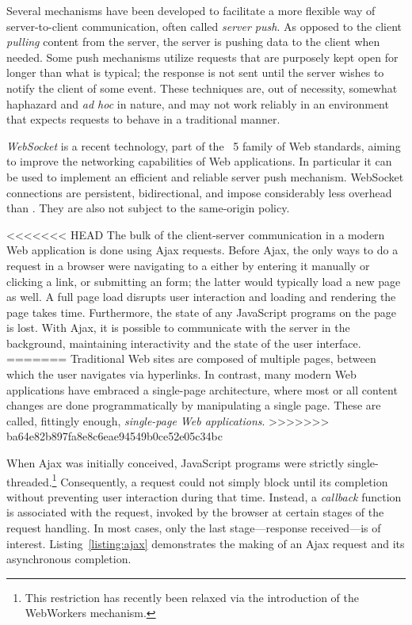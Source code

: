 Several mechanisms have been developed to facilitate a more flexible way of server-to-client communication, often called \emph{server push}. As opposed to the client \emph{pulling} content from the server, the server is pushing data to the client when needed. Some push mechanisms utilize  requests that are purposely kept open for longer than what is typical; the response is not sent until the server wishes to notify the client of some event. These techniques are, out of necessity, somewhat haphazard and \emph{ad hoc} in nature, and may not work reliably in an environment that expects  requests to behave in a traditional manner.

\emph{WebSocket} is a recent technology, part of the ~5 family of Web standards, aiming to improve the networking capabilities of Web applications. In particular it can be used to implement an efficient and reliable server push mechanism. WebSocket connections are persistent, bidirectional, and impose considerably less overhead than . They are also not subject to the same-origin policy.

<<<<<<< HEAD
The bulk of the client-server communication in a modern Web application is done using Ajax requests. Before Ajax, the only ways to do a  request in a browser were navigating to a  either by entering it manually or clicking a link, or submitting an  form; the latter would typically load a new page as well. A full page load disrupts user interaction and loading and rendering the page takes time. Furthermore, the state of any JavaScript programs on the page is lost. With Ajax, it is possible to communicate with the server in the background, maintaining interactivity and the state of the user interface. 
=======
Traditional Web sites are composed of multiple pages, between which the user navigates via hyperlinks. In contrast, many modern Web applications have embraced a single-page architecture, where most or all content changes are done programmatically by manipulating a single  page. These are called, fittingly enough, \emph{single-page Web applications}.
>>>>>>> ba64e82b897fa8e8c6eae94549b0ce52e05c34bc

When Ajax was initially conceived, JavaScript programs were strictly single-threaded.\footnote{This restriction has recently been relaxed via the introduction of the WebWorkers mechanism.} Consequently, a request could not simply block until its completion without preventing user interaction during that time. Instead, a \emph{callback} function is associated with the request, invoked by the browser at certain stages of the request handling. In most cases, only the last stage---response received---is of interest. Listing~\ref{listing:ajax} demonstrates the making of an Ajax request and its asynchronous completion.


